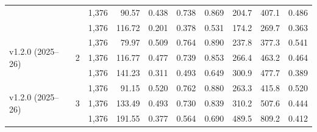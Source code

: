 \begin{tabular}{@{}llrrrrrrrr@{}}
& & 1,376 & 90.57 & 0.438 & 0.738 & 0.869 & 204.7 & 407.1 & 0.486 \\
& & 1,376 & 116.72 & 0.201 & 0.378 & 0.531 & 174.2 & 269.7 & 0.363 \\
\midrule
\multirow{3}{*}{v1.2.0 (2025--26)} & \multirow{3}{*}{2} & 1,376 & 79.97 & 0.509 & 0.764 & 0.890 & 237.8 & 377.3 & 0.541 \\
& & 1,376 & 116.77 & 0.477 & 0.739 & 0.853 & 266.4 & 463.2 & 0.464 \\
& & 1,376 & 141.23 & 0.311 & 0.493 & 0.649 & 300.9 & 477.7 & 0.389 \\
\midrule
\multirow{3}{*}{v1.2.0 (2025--26)} & \multirow{3}{*}{3} & 1,376 & 91.15 & 0.520 & 0.762 & 0.880 & 263.3 & 415.8 & 0.520 \\
& & 1,376 & 133.49 & 0.493 & 0.730 & 0.839 & 310.2 & 507.6 & 0.444 \\
& & 1,376 & 191.55 & 0.377 & 0.564 & 0.690 & 489.5 & 809.2 & 0.412 \\
\bottomrule
\end{tabular}
